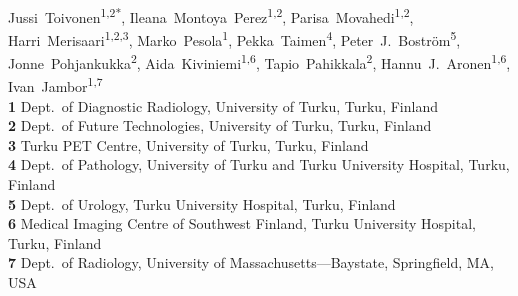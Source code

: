 \documentclass[10pt,letterpaper]{article}
\newcommand{\turku}{Turku, Finland}
\newcommand{\utu}{University of Turku}
\newcommand{\tyks}{Turku University Hospital}
\newcommand{\deptdr}{Dept.\ of Diagnostic Radiology}
\newcommand{\deptft}{Dept.\ of Future Technologies}
\begin{document}
\vspace*{0.2in}

\begin{flushleft}
{\Large
\textbf{}
}
\newline
\\
Jussi~Toivonen\textsuperscript{1,2*},
Ileana~Montoya~Perez\textsuperscript{1,2},
Parisa~Movahedi\textsuperscript{1,2},
Harri~Merisaari\textsuperscript{1,2,3},
Marko~Pesola\textsuperscript{1},
Pekka~Taimen\textsuperscript{4},
Peter~J.~Boström\textsuperscript{5},
Jonne~Pohjankukka\textsuperscript{2},
Aida~Kiviniemi\textsuperscript{1,6},
Tapio~Pahikkala\textsuperscript{2},
Hannu~J.~Aronen\textsuperscript{1,6},
Ivan~Jambor\textsuperscript{1,7}
\\
\bigskip
\textbf{1} \deptdr, \utu, \turku\\
\textbf{2} \deptft, \utu, \turku\\
\textbf{3} Turku PET Centre, \utu, \turku\\
\textbf{4} Dept.\ of Pathology, \utu{} and \tyks, \turku\\
\textbf{5} Dept.\ of Urology, \tyks, \turku\\
\textbf{6} Medical Imaging Centre of Southwest Finland, \tyks, \turku\\
\textbf{7} Dept.\ of Radiology, University of Massachusetts---Baystate,
Springfield, MA, USA\\
\bigskip


\end{flushleft}
\end{document}
